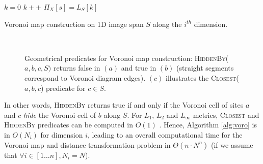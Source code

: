 \documentclass{llncs}
\begin{document}
\begin{algorithm}[H]\footnotesize
{ $k=0$\;
}
  {
          {
            $k++$\;
          }
    $\Pi_X[s] = L_S[k]$\;
  }

  \caption{Voronoi map construction on 1D image span $S$ along the
    $i^{th}$ dimension.\label{alg:voro}}
\end{algorithm}
\begin{figure}
  \begin{center}
    ~~~~~~~~~~
  \end{center}
  \caption{\small Geometrical predicates for Voronoi map construction:
    \textsc{HiddenBy}($a,b,c,S)$ returns false in $(a)$ and true in
    $(b)$ (straight segments correspond to Voronoi diagram
    edges). $(c)$ illustrates the \textsc{Closest}($a,b,c$) predicate
    for $c\in S$.}
  \label{fig:predicates}
\end{figure}


In other words, \textsc{HiddenBy} returns true if and only if the
Voronoi cell of sites $a$ and $c$ \emph{hide} the Voronoi cell of $b$
along $S$.  For $L_1$, $L_2$ and $L_\infty$ metrics,
\textsc{Closest} and \textsc{HiddenBy} predicates can be computed in
$O(1)$ \cite{Breu1995,Hirata1996,Meijster2000}. Hence, Algorithm
\ref{alg:voro} is in $O(N_i)$ for dimension $i$, leading to an overall
computational time for the Voronoi map and distance transformation
problem in $\Theta(n\cdot N^n)$ (if we assume that $\forall i\in[1\ldots
  n], N_i=N$).
\end{document}
